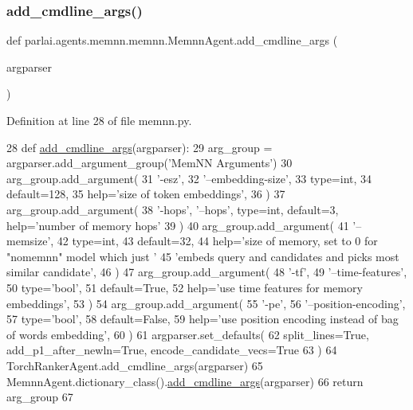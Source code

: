 \subsubsection{\texorpdfstring{add\+\_\+cmdline\+\_\+args()}{add\_cmdline\_args()}}
{\footnotesize\ttfamily def parlai.\+agents.\+memnn.\+memnn.\+Memnn\+Agent.\+add\+\_\+cmdline\+\_\+args (\begin{DoxyParamCaption}\item[{}]{argparser }\end{DoxyParamCaption})\hspace{0.3cm}{\ttfamily [static]}}



Definition at line 28 of file memnn.\+py.


\begin{DoxyCode}
28     \textcolor{keyword}{def }\hyperlink{namespaceparlai_1_1agents_1_1drqa_1_1config_a62fdd5554f1da6be0cba185271058320}{add\_cmdline\_args}(argparser):
29         arg\_group = argparser.add\_argument\_group(\textcolor{stringliteral}{'MemNN Arguments'})
30         arg\_group.add\_argument(
31             \textcolor{stringliteral}{'-esz'},
32             \textcolor{stringliteral}{'--embedding-size'},
33             type=int,
34             default=128,
35             help=\textcolor{stringliteral}{'size of token embeddings'},
36         )
37         arg\_group.add\_argument(
38             \textcolor{stringliteral}{'-hops'}, \textcolor{stringliteral}{'--hops'}, type=int, default=3, help=\textcolor{stringliteral}{'number of memory hops'}
39         )
40         arg\_group.add\_argument(
41             \textcolor{stringliteral}{'--memsize'},
42             type=int,
43             default=32,
44             help=\textcolor{stringliteral}{'size of memory, set to 0 for "nomemnn" model which just '}
45             \textcolor{stringliteral}{'embeds query and candidates and picks most similar candidate'},
46         )
47         arg\_group.add\_argument(
48             \textcolor{stringliteral}{'-tf'},
49             \textcolor{stringliteral}{'--time-features'},
50             type=\textcolor{stringliteral}{'bool'},
51             default=\textcolor{keyword}{True},
52             help=\textcolor{stringliteral}{'use time features for memory embeddings'},
53         )
54         arg\_group.add\_argument(
55             \textcolor{stringliteral}{'-pe'},
56             \textcolor{stringliteral}{'--position-encoding'},
57             type=\textcolor{stringliteral}{'bool'},
58             default=\textcolor{keyword}{False},
59             help=\textcolor{stringliteral}{'use position encoding instead of bag of words embedding'},
60         )
61         argparser.set\_defaults(
62             split\_lines=\textcolor{keyword}{True}, add\_p1\_after\_newln=\textcolor{keyword}{True}, encode\_candidate\_vecs=\textcolor{keyword}{True}
63         )
64         TorchRankerAgent.add\_cmdline\_args(argparser)
65         MemnnAgent.dictionary\_class().\hyperlink{namespaceparlai_1_1agents_1_1drqa_1_1config_a62fdd5554f1da6be0cba185271058320}{add\_cmdline\_args}(argparser)
66         \textcolor{keywordflow}{return} arg\_group
67 
\end{DoxyCode}
